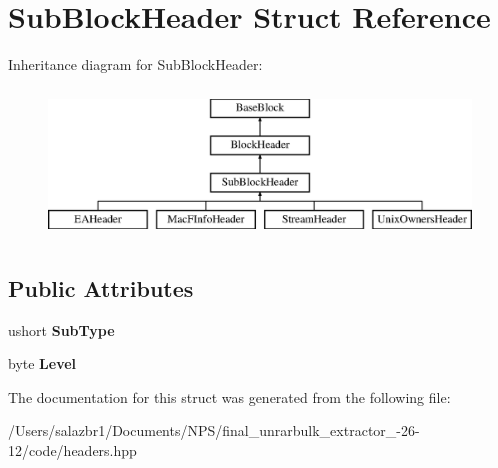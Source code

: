\hypertarget{struct_sub_block_header}{\section{Sub\-Block\-Header Struct Reference}
\label{struct_sub_block_header}
}
Inheritance diagram for Sub\-Block\-Header\-:\begin{figure}[H]
\begin{center}
\leavevmode
\includegraphics[height=4.000000cm]{struct_sub_block_header}
\end{center}
\end{figure}
\subsection*{Public Attributes}
\begin{DoxyCompactItemize}
\item 
\hypertarget{struct_sub_block_header_a74376e79e3058ed772ec9d23144749ae}{ushort {\bfseries Sub\-Type}}\label{struct_sub_block_header_a74376e79e3058ed772ec9d23144749ae}

\item 
\hypertarget{struct_sub_block_header_a26a4bdc742f6c521058089ac5be2da28}{byte {\bfseries Level}}\label{struct_sub_block_header_a26a4bdc742f6c521058089ac5be2da28}

\end{DoxyCompactItemize}


The documentation for this struct was generated from the following file\-:\begin{DoxyCompactItemize}
\item 
/\-Users/salazbr1/\-Documents/\-N\-P\-S/final\-\_\-unrarbulk\-\_\-extractor\-\_-\/26-\/12/code/headers.\-hpp\end{DoxyCompactItemize}
